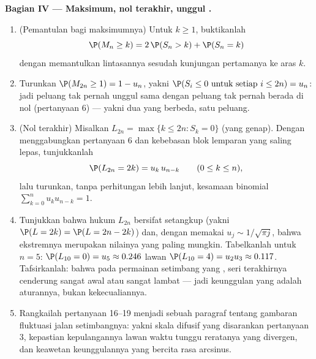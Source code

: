 \begin{problem}
\medskip
\noindent\textbf{Bagian IV --- Maksimum, nol terakhir, unggul .}
\begin{enumerate}[resume]
  \item (Pemantulan bagi maksimumnya) Untuk $k \geq 1$, buktikanlah
        \[
        \P(M_n \geq k) = 2\,\P(S_n > k) + \P(S_n = k)
        \]
        dengan memantulkan lintasannya sesudah kunjungan pertamanya ke
        aras $k$.
  \item Turunkan $\P(M_{2n} \geq 1) = 1 - u_n$, yakni
        $\P(S_i \leq 0 \text{ untuk setiap } i \leq 2n) = u_n$:
        jadi peluang tak pernah unggul sama dengan
        peluang tak pernah berada di nol (pertanyaan 6) ---
        yakni dua  yang berbeda, satu peluang.
  \item (Nol terakhir) Misalkan $L_{2n} = \max\{k \leq 2n : S_k =
        0\}$ (yang genap). Dengan menggabungkan pertanyaan 6 dan kebebasan
        blok lemparan yang saling lepas, tunjukkanlah
        \[
        \P(L_{2n} = 2k) = u_k\,u_{n-k}
        \qquad (0 \leq k \leq n),
        \]
        lalu turunkan, tanpa perhitungan lebih lanjut, kesamaan
        binomial $\sum_{k=0}^n u_ku_{n-k} = 1$.
  \item Tunjukkan bahwa hukum $L_{2n}$ bersifat setangkup (yakni $\P(L =
        2k) = \P(L = 2n - 2k)$) dan, dengan memakai $u_j \sim
        1/\sqrt{\pi j}$, bahwa ekstremnya merupakan nilainya yang paling
        mungkin. Tabelkanlah untuk $n = 5$: $\P(L_{10} = 0)
        = u_5 \approx 0.246$ lawan $\P(L_{10} = 4) = u_2u_3
        \approx 0.117$. Tafsirkanlah: bahwa pada permainan setimbang yang ,
        seri terakhirnya cenderung sangat awal atau sangat lambat ---
        jadi keunggulan yang  adalah aturannya, bukan kekecualiannya.
  \item Rangkailah pertanyaan 16--19 menjadi sebuah paragraf tentang
        gambaran fluktuasi jalan setimbangnya: yakni skala difusif
        yang disarankan pertanyaan 3, kepastian
        kepulangannya lawan waktu tunggu reratanya yang divergen, dan
        keawetan keunggulannya yang bercita rasa arcsinus.
\end{enumerate}


\end{problem}
